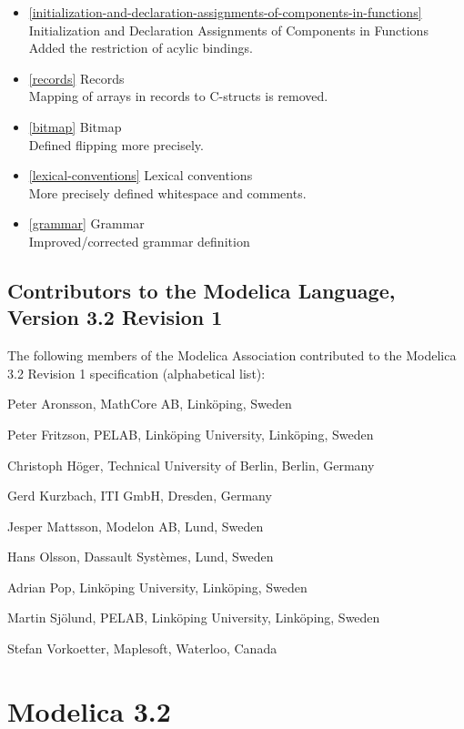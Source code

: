 \begin{itemize}
\item
  \autoref{initialization-and-declaration-assignments-of-components-in-functions} Initialization and Declaration Assignments of
  Components in Functions\\
  Added the restriction of acylic bindings.
\item
  \autoref{records} Records\\
  Mapping of arrays in records to C-structs is removed.
\item
  \autoref{bitmap} Bitmap\\
  Defined flipping more precisely.
\item
  \autoref{lexical-conventions} Lexical conventions\\
  More precisely defined whitespace and comments.
\item
  \autoref{grammar} Grammar\\
  Improved/corrected grammar definition
\end{itemize}

\subsection{Contributors to the Modelica Language, Version 3.2 Revision 1}

The following members of the Modelica Association contributed to the
Modelica 3.2 Revision 1 specification (alphabetical list):

Peter Aronsson, MathCore AB, Linköping, Sweden

Peter Fritzson, PELAB, Linköping University, Linköping, Sweden

Christoph Höger, Technical University of Berlin, Berlin, Germany

Gerd Kurzbach, ITI GmbH, Dresden, Germany

Jesper Mattsson, Modelon AB, Lund, Sweden

Hans Olsson, Dassault Systèmes, Lund, Sweden

Adrian Pop, Linköping University, Linköping, Sweden

Martin Sjölund, PELAB, Linköping University, Linköping, Sweden

Stefan Vorkoetter, Maplesoft, Waterloo, Canada

\section{Modelica 3.2}

